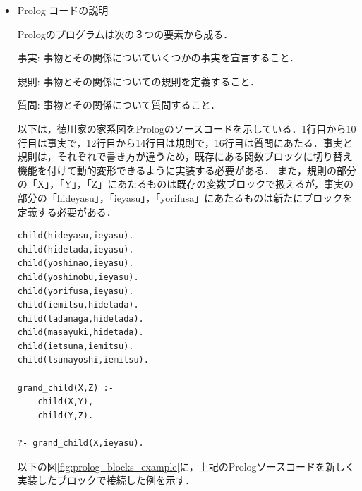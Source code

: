 \documentclass{risepaper}
\begin{document}
\begin{itemize}   

\item Prolog コードの説明

Prologのプログラムは次の３つの要素から成る．

事実: 事物とその関係についていくつかの事実を宣言すること．

規則: 事物とその関係についての規則を定義すること．

質問: 事物とその関係について質問すること．

以下は，徳川家の家系図をPrologのソースコードを示している．1行目から10行目は事実で，12行目から14行目は規則で，16行目は質問にあたる．事実と規則は，それぞれで書き方が違うため，既存にある関数ブロックに切り替え機能を付けて動的変形できるように実装する必要がある．
また，規則の部分の「X」，「Y」，「Z」にあたるものは既存の変数ブロックで扱えるが，事実の部分の「hideyasu」，「ieyasu」，「yorifusa」にあたるものは新たにブロックを定義する必要がある．
\begin{lstlisting}[basicstyle=\ttfamily\footnotesize]
child(hideyasu,ieyasu).
child(hidetada,ieyasu).
child(yoshinao,ieyasu).
child(yoshinobu,ieyasu).
child(yorifusa,ieyasu).
child(iemitsu,hidetada).
child(tadanaga,hidetada).
child(masayuki,hidetada).
child(ietsuna,iemitsu).
child(tsunayoshi,iemitsu).

grand_child(X,Z) :-
    child(X,Y),
    child(Y,Z).

?- grand_child(X,ieyasu).
\end{lstlisting}

以下の図\ref{fig:prolog_blocks_example}に，上記のPrologソースコードを新しく実装したブロックで接続した例を示す．


\end{itemize}
\end{document}
